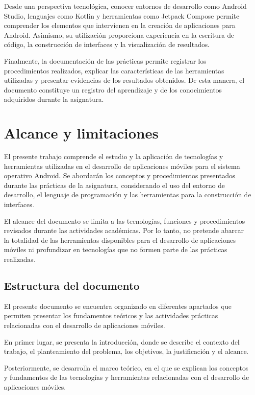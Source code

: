 \documentclass[12pt,a4paper]{article}
\begin{document}
Desde una perspectiva tecnológica, conocer entornos de
desarrollo como Android Studio, lenguajes como Kotlin y
herramientas como Jetpack Compose permite comprender los
elementos que intervienen en la creación de aplicaciones
para Android. Asimismo, su utilización proporciona experiencia
en la escritura de código, la construcción de interfaces y
la visualización de resultados.

Finalmente, la documentación de las prácticas permite
registrar los procedimientos realizados, explicar las
características de las herramientas utilizadas y presentar
evidencias de los resultados obtenidos. De esta manera, el
documento constituye un registro del aprendizaje y de los
conocimientos adquiridos durante la asignatura.

\section{Alcance y limitaciones}

El presente trabajo comprende el estudio y la aplicación
de tecnologías y herramientas utilizadas en el desarrollo
de aplicaciones móviles para el sistema operativo Android.
Se abordarán los conceptos y procedimientos presentados
durante las prácticas de la asignatura, considerando el uso
del entorno de desarrollo, el lenguaje de programación y
las herramientas para la construcción de interfaces.

El alcance del documento se limita a las tecnologías,
funciones y procedimientos revisados durante las actividades
académicas. Por lo tanto, no pretende abarcar la totalidad
de las herramientas disponibles para el desarrollo de
aplicaciones móviles ni profundizar en tecnologías que no
formen parte de las prácticas realizadas.

\subsection{Estructura del documento}

El presente documento se encuentra organizado en diferentes
apartados que permiten presentar los fundamentos teóricos
y las actividades prácticas relacionadas con el desarrollo
de aplicaciones móviles.

En primer lugar, se presenta la introducción, donde se
describe el contexto del trabajo, el planteamiento del
problema, los objetivos, la justificación y el alcance.

Posteriormente, se desarrolla el marco teórico, en el que
se explican los conceptos y fundamentos de las tecnologías
y herramientas relacionadas con el desarrollo de
aplicaciones móviles.
\end{document}
